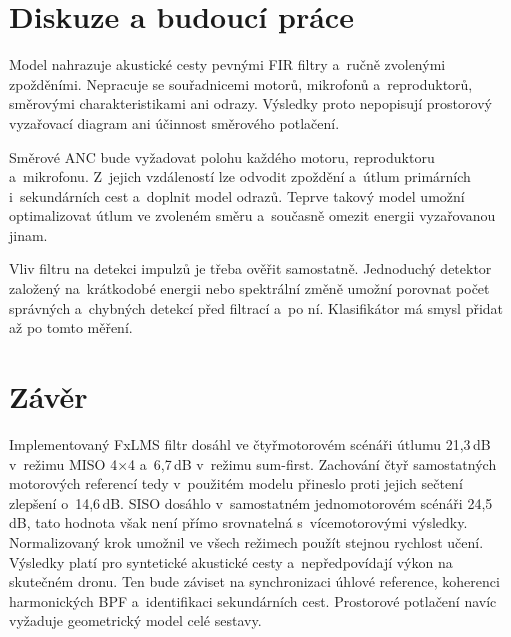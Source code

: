 \documentclass[conference]{IEEEtran}
\begin{document}
\section{Diskuze a budoucí práce}
Model nahrazuje akustické cesty pevnými FIR filtry a~ručně zvolenými zpožděními. Nepracuje se souřadnicemi motorů, mikrofonů a~reproduktorů, směrovými charakteristikami ani odrazy. Výsledky proto nepopisují prostorový vyzařovací diagram ani účinnost směrového potlačení.

Směrové ANC bude vyžadovat polohu každého motoru, reproduktoru a~mikrofonu. Z~jejich vzdáleností lze odvodit zpoždění a~útlum primárních i~sekundárních cest a~doplnit model odrazů. Teprve takový model umožní optimalizovat útlum ve zvoleném směru a~současně omezit energii vyzařovanou jinam.

Vliv filtru na detekci impulzů je třeba ověřit samostatně. Jednoduchý detektor založený na~krátkodobé energii nebo spektrální změně umožní porovnat počet správných a~chybných detekcí před filtrací a~po ní. Klasifikátor má smysl přidat až po tomto měření.

\section{Závěr}
Implementovaný FxLMS filtr dosáhl ve čtyřmotorovém scénáři útlumu 21{,}3\,dB v~režimu MISO 4$\times$4 a~6{,}7\,dB v~režimu sum-first. Zachování čtyř samostatných motorových referencí tedy v~použitém modelu přineslo proti jejich sečtení zlepšení o~14{,}6\,dB. SISO dosáhlo v~samostatném jednomotorovém scénáři 24{,}5\,dB, tato hodnota však není přímo srovnatelná s~vícemotorovými výsledky. Normalizovaný krok umožnil ve všech režimech použít stejnou rychlost učení. Výsledky platí pro syntetické akustické cesty a~nepředpovídají výkon na skutečném dronu. Ten bude záviset na synchronizaci úhlové reference, koherenci harmonických BPF a~identifikaci sekundárních cest. Prostorové potlačení navíc vyžaduje geometrický model celé sestavy.



\end{document}
